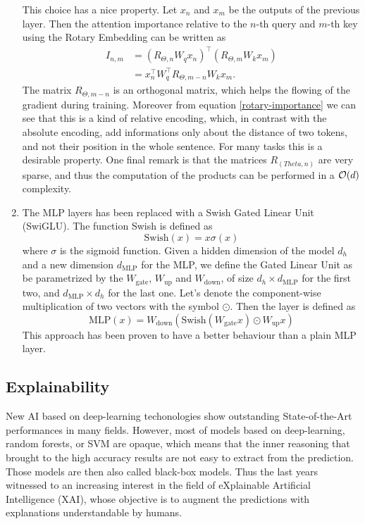 \documentclass[]{marticle}
\begin{document}
\begin{enumerate}
This choice has a nice property. Let $x_n$ and $x_m$ be the outputs of the previous layer. Then
the attention importance relative to the $n$-th query and $m$-th key using the Rotary Embedding
can be written as
\begin{align}\label{rotary-importance}
I_{n,m} &= (R_{\Theta, n}W_q x_n)^\top (R_{\Theta, m}W_k x_m) \\ 
        &=  x_n^\top W_q^\top R_{\Theta, m-n} W_k x_m. \nonumber
\end{align}
The matrix $R_{\Theta, m-n}$ is an orthogonal matrix, which helps the flowing of the gradient
during training. Moreover from equation \ref{rotary-importance} we can see that this is a kind of
relative encoding, which, in contrast with the absolute encoding, add informations only about the
distance of two tokens, and not their position in the whole sentence. For many tasks this is a
desirable property. One final remark is that the matrices $R_(Theta, n)$ are very sparse, and thus
the computation of the products can be performed in a $\mathcal{O}(d)$ complexity.

\item The MLP layers has been replaced with a Swish Gated Linear Unit (SwiGLU). The function Swish
is defined as
$$ \text{Swish}(x) = x \sigma(x) $$
where $\sigma$ is the sigmoid function. Given a hidden dimension of the model $d_h$ and a new
dimension $d_\text{MLP}$ for the MLP, we define the Gated Linear Unit as be parametrized by the
$W_\text{gate}$, $W_\text{up}$ and $W_\text{down}$, of size $d_h\times d_\text{MLP}$ for the first
two, and $d_\text{MLP} \times d_h$ for the last one. Let's denote the component-wise multiplication
of two vectors with the symbol $\odot$. Then the layer is defined as $$ \text{MLP}(x) =
W_\text{down} (\text{Swish}(W_\text{gate} x) \odot W_\text{up} x) $$ This approach has been proven
to have a better behaviour than a plain MLP layer.
\end{enumerate}

\subsection{Explainability}

New AI based on deep-learning techonologies show outstanding State-of-the-Art performances in many
fields. However, most of models based on deep-learning, random forests, or SVM are opaque, which
means that the inner reasoning that brought to the high accuracy results are not easy to extract
from the prediction.  Those models are then also called black-box models. Thus the last years
witnessed to an increasing interest in the field of eXplainable Artificial Intelligence (XAI), whose
objective is to augment the predictions with explanations understandable by humans.
\end{document}
